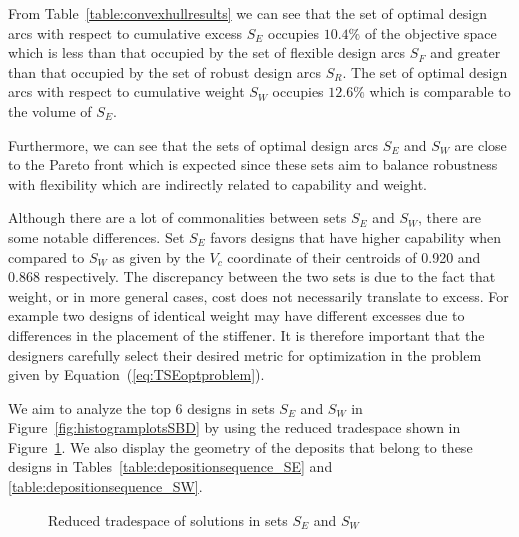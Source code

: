 From Table~\ref{table:convexhullresults} we can see that the set of optimal design arcs with respect to cumulative excess $S_E$ occupies $10.4\%$ of the objective space which is less than that occupied by the set of flexible design arcs $S_F$ and greater than that occupied by the set of robust design arcs $S_R$. The set of optimal design arcs with respect to cumulative weight $S_W$ occupies $12.6\%$ which is comparable to the volume of $S_E$.

Furthermore, we can see that the sets of optimal design arcs $S_E$ and $S_W$ are close to the Pareto front which is expected since these sets aim to balance robustness with flexibility which are indirectly related to capability and weight.

Although there are a lot of commonalities between sets $S_E$ and $S_W$, there are some notable differences. Set $S_E$ favors designs that have higher capability when compared to $S_W$ as given by the $V_c$ coordinate of their centroids of 0.920 and 0.868 respectively. The discrepancy between the two sets is due to the fact that weight, or in more general cases, cost does not necessarily translate to excess. For example two designs of identical weight may have different excesses due to differences in the placement of the stiffener. It is therefore important that the designers carefully select their desired metric for optimization in the problem given by Equation~(\ref{eq:TSEoptproblem}).

We aim to analyze the top 6 designs in sets $S_E$ and $S_W$ in Figure~\ref{fig:histogramplotsSBD} by using the reduced tradespace shown in Figure~\ref{fig:reducedTSE}. We also display the geometry of the deposits that belong to these designs in Tables~\ref{table:depositionsequence_SE} and \ref{table:depositionsequence_SW}.

\begin{figure}[h!]
	\centering
	\caption{Reduced tradespace of solutions in sets $S_E$ and $S_W$}
	\label{fig:reducedTSE}
\end{figure}

